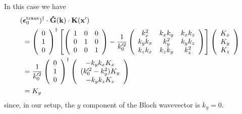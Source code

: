 \documentclass[letterpaper]{article}
\newcommand{\vbEps}{\boldsymbol{\epsilon}}
\begin{document}
In this case we have 
\begin{align}
&\hspace{-0.05in}
 (\vbEps_0\sups{trans})^\dagger \cdot
 \vbhat{G}(\vb k) \cdot \vb K(\vb x^\prime)
\nn
&=
 \left(\begin{array}{c}0 \\ 1 \\ 0\end{array}\right)^\dagger
 \left[ \left(\begin{array}{ccc}
               1 & 0 & 0 \\ 
               0 & 1 & 0 \\ 
               0 & 0 & 1
              \end{array}\right)
       -\frac{1}{k_0^{\prime 2}}
        \left(\begin{array}{ccc}
               k_x^2   & k_x k_y & k_x k_z \\
               k_yk_x  & k_y^2   & k_y k_z \\
               k_z k_x & k_z k_y & k_z^2
              \end{array}
        \right)
 \right]
 \left(\begin{array}{c}K_x \\ K_y \\ K_z\end{array}\right)
\nn
&=
 \frac{1}{k_0^{\prime 2}}
 \left(\begin{array}{c}0 \\ 1 \\ 0\end{array}\right)^\dagger
 \left(\begin{array}{c} -k_y k_x K_x \\ (k_0^{\prime 2}-k_y^2)K_y \\ -k_y k_z K_z
       \end{array}\right)
\nn
&= K_y
\label{ECN1}
\end{align}
since, in our setup, the $y$ component of the Bloch 
wavevector is $k_y=0.$
\end{document}
